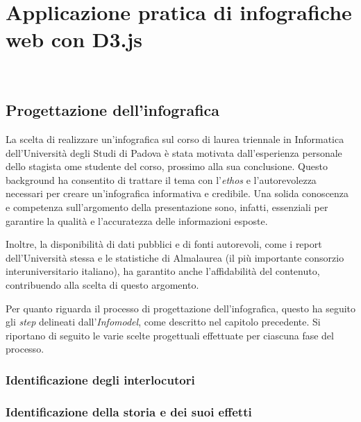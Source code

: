 \chapter{Applicazione pratica di infografiche web con D3.js}
\label{cap:applicazione}
\\

\section{Progettazione dell'infografica}
La scelta di realizzare un'infografica sul corso di laurea triennale in Informatica dell'Università degli Studi di Padova è stata motivata dall'esperienza personale dello stagista ome 
studente del corso, prossimo alla sua conclusione. 
Questo background ha consentito di trattare il tema con l'\emph{ethos} e l'autorevolezza necessari per creare un'infografica informativa e credibile.
Una solida conoscenza e competenza sull'argomento della presentazione sono, infatti, essenziali per garantire la qualità e l'accuratezza delle informazioni esposte.  

Inoltre, la disponibilità di dati pubblici e di fonti autorevoli, come i report dell'Università stessa e le statistiche di Almalaurea (il più importante consorzio interuniversitario italiano), ha 
garantito anche l'affidabilità del contenuto, contribuendo alla scelta di questo argomento.

\bigskip
\noindent Per quanto riguarda il processo di progettazione dell'infografica, questo ha seguito gli \emph{step} delineati dall'\emph{Infomodel}, come descritto nel capitolo precedente. 
Si riportano di seguito le varie scelte progettuali effettuate per ciascuna fase del processo.

\subsection{Identificazione degli interlocutori}

\subsection{Identificazione della storia e dei suoi effetti}


